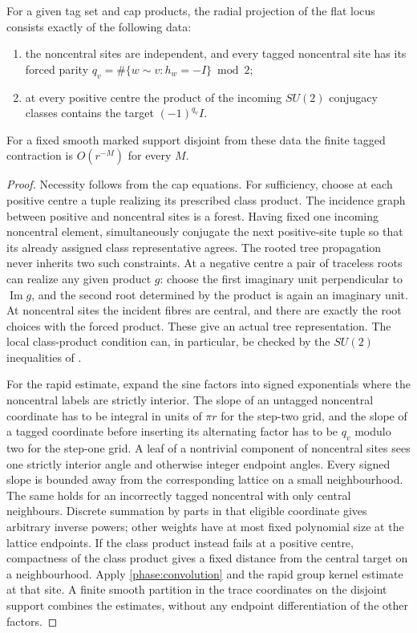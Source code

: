 \begin{proposition}
\label{phase:offsupport}
For a given tag set and cap products, the radial projection of the flat locus consists exactly of the following data:
\begin{enumerate}
 \item the noncentral sites are independent, and every tagged noncentral site has its forced parity \(q_v=\#\{w\sim v:h_w=-I\}\bmod2\);
 \item at every positive centre the product of the incoming \(SU(2)\) conjugacy classes contains the target \((-1)^{q_v}I\).
\end{enumerate}
For a fixed smooth marked support disjoint from these data the finite tagged contraction is \(O(r^{-M})\) for every \(M\).
\end{proposition}

\begin{proof}
Necessity follows from the cap equations. For sufficiency, choose at each positive centre a tuple realizing its prescribed class product. The incidence graph between positive and noncentral sites is a forest. Having fixed one incoming noncentral element, simultaneously conjugate the next positive-site tuple so that its already assigned class representative agrees. The rooted tree propagation never inherits two such constraints. At a negative centre a pair of traceless roots can realize any given product \(g\): choose the first imaginary unit perpendicular to \(\operatorname{Im}g\), and the second root determined by the product is again an imaginary unit. At noncentral sites the incident fibres are central, and there are exactly the root choices with the forced product. These give an actual tree representation. The local class-product condition can, in particular, be checked by the \(SU(2)\) inequalities of \cite[Theorem 2.2]{JeffreyMare}.

For the rapid estimate, expand the sine factors into signed exponentials where the noncentral labels are strictly interior. The slope of an untagged noncentral coordinate has to be integral in units of \(\pi r\) for the step-two grid, and the slope of a tagged coordinate before inserting its alternating factor has to be \(q_v\) modulo two for the step-one grid. A leaf of a nontrivial component of noncentral sites sees one strictly interior angle and otherwise integer endpoint angles. Every signed slope is bounded away from the corresponding lattice on a small neighbourhood. The same holds for an incorrectly tagged noncentral with only central neighbours. Discrete summation by parts in that eligible coordinate gives arbitrary inverse powers; other weights have at most fixed polynomial size at the lattice endpoints. If the class product instead fails at a positive centre, compactness of the class product gives a fixed distance from the central target on a neighbourhood. Apply \eqref{phase:convolution} and the rapid group kernel estimate at that site. A finite smooth partition in the trace coordinates on the disjoint support combines the estimates, without any endpoint differentiation of the other factors.
\end{proof}

